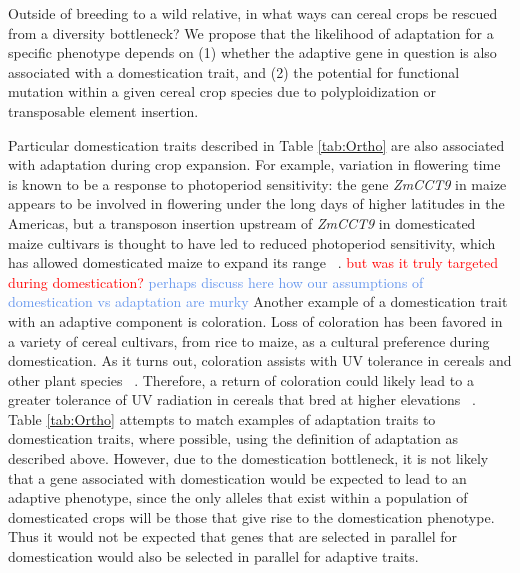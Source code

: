 \documentclass[12pt]{article}
\newcommand{\mbh}[1]{\textcolor{red}{\normalsize  #1}}
\newcommand{\mw}[1]{\textcolor{cornflowerblue}{\normalsize #1}}
\begin{document}
Outside of breeding to a wild relative, in what ways can cereal crops be rescued from a diversity bottleneck? 
We propose that the likelihood of adaptation for a specific phenotype depends on (1) whether the adaptive gene in question is also associated with a domestication trait, and (2) the potential for functional mutation within a given cereal crop species due to polyploidization or transposable element insertion. 

Particular domestication traits described in Table \ref{tab:Ortho} are also associated with adaptation during crop expansion.
For example, variation in flowering time is known to be a response to photoperiod sensitivity: the gene \textit{ZmCCT9} in maize appears to be involved in flowering under the long days of higher latitudes in the Americas, but a transposon insertion upstream of \textit{ZmCCT9} in domesticated maize cultivars is thought to have led to reduced photoperiod sensitivity, which has allowed domesticated maize to expand its range ~\citep{Huang2017}.
\mbh{but was it truly targeted during domestication?} \mw{perhaps discuss here how our assumptions of domestication vs adaptation are murky}
Another example of a domestication trait with an adaptive component is coloration.
Loss of coloration has been favored in a variety of cereal cultivars, from rice to maize, as a cultural preference during domestication.
As it turns out, coloration assists with UV tolerance in cereals and other plant species ~\citep{pmid8058838, Gould2004}.
Therefore, a return of coloration could likely lead to a greater tolerance of UV radiation in cereals that bred at higher elevations ~\citep{Pyhjrvi2013}.
Table \ref{tab:Ortho} attempts to match examples of adaptation traits to domestication traits, where possible, using the definition of adaptation as described above. 
However, due to the domestication bottleneck, it is not likely that a gene associated with domestication would be expected to lead to an adaptive phenotype, since the only alleles that exist within a population of domesticated crops will be those that give rise to the domestication phenotype. Thus it would not be expected that genes that are selected in parallel for domestication would also be selected in parallel for adaptive traits. 
\end{document}
